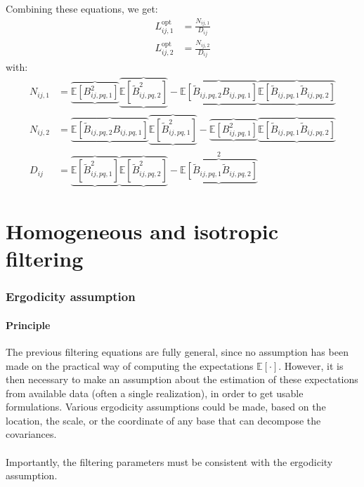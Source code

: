 \documentclass[12pt]{scrartcl}
\begin{document}
Combining these equations, we get:
\begin{subequations}
\label{eq:de_th_com}
\begin{align}
L_{ij,1}^\mathrm{opt} & = \frac{N_{ij,1}}{D_{ij}}\\
L_{ij,2}^\mathrm{opt} & = \frac{N_{ij,2}}{D_{ij}}
\end{align}
\end{subequations}
with:
\begin{subequations}
\begin{align}
N_{ij,1} & = \underbrace{\overbrace{\mathbb{E} \left[B^2_{ij,pq,1}\right]}} \underbrace{\overbrace{\mathbb{E} \left[\widetilde{B}_{ij,pq,2}^2\right]}} - \underbrace{\overbrace{\mathbb{E} \left[\widetilde{B}_{ij,pq,2} B_{ij,pq,1}\right]}} \underbrace{\overbrace{\mathbb{E} \left[\widetilde{B}_{ij,pq,1} \widetilde{B}_{ij,pq,2}\right]}} \\
N_{ij,2} & = \underbrace{\overbrace{\mathbb{E} \left[\widetilde{B}_{ij,pq,2} B_{ij,pq,1}\right]}} \underbrace{\overbrace{\mathbb{E} \left[\widetilde{B}_{ij,pq,1}^2\right]}} - \underbrace{\overbrace{\mathbb{E} \left[B^2_{ij,pq,1}\right]}} \underbrace{\overbrace{\mathbb{E} \left[\widetilde{B}_{ij,pq,1} \widetilde{B}_{ij,pq,2}\right]}} \\
D_{ij} & = \underbrace{\overbrace{\mathbb{E} \left[\widetilde{B}_{ij,pq,1}^2\right]}} \underbrace{\overbrace{\mathbb{E} \left[\widetilde{B}_{ij,pq,2}^2\right]}} - {\underbrace{\overbrace{\mathbb{E} \left[\widetilde{B}_{ij,pq,1} \widetilde{B}_{ij,pq,2}\right]}}}^2
\end{align}
\end{subequations}

\clearpage

\part{Homogeneous and isotropic filtering}

\section{Ergodicity assumption}

\subsection{Principle}
The previous filtering equations are fully general, since no assumption has been made on the practical way of computing the expectations $\mathbb{E}\left[\cdot\right]$. However, it is then necessary to make an assumption about the estimation of these expectations from available data (often a single realization), in order to get usable formulations. Various ergodicity assumptions could be made, based on the location, the scale, or the coordinate of any base that can decompose the covariances.\\
$  $\\
Importantly, the filtering parameters must be consistent with the ergodicity assumption.
\end{document}
